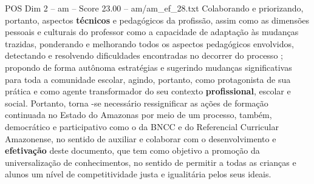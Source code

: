 \begin{textsample}{POS Dim 2 – am – Score 23.00 – am/am\_ef\_28.txt}
Colaborando e priorizando, portanto, aspectos \textbf{técnicos} e pedagógicos da profissão, assim como as dimensões pessoais e culturais do professor como a capacidade de adaptação às mudanças trazidas, ponderando e melhorando todos os aspectos pedagógicos envolvidos, detectando e resolvendo dificuldades encontradas no decorrer do processo ; propondo de forma autônoma estratégias e sugerindo mudanças significativas para toda a comunidade escolar, agindo, portanto, como protagonista de sua prática e como agente transformador do seu contexto \textbf{profissional}, escolar e social.
Portanto, torna -se necessário ressignificar as ações de formação continuada no Estado do Amazonas por meio de um processo, também, democrático e participativo como o da BNCC e do Referencial Curricular Amazonense, no sentido de auxiliar e colaborar com o desenvolvimento e \textbf{efetivação} deste documento, que tem como objetivo a promoção da universalização de conhecimentos, no sentido de permitir a todas as crianças e alunos um nível de competitividade justa e igualitária pelos seus ideais.

\end{textsample}
